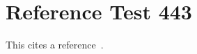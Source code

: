 \documentclass{article}
\begin{document}
\section{Reference Test 443}
This cites a reference~\cite{test443}.

\end{document}

